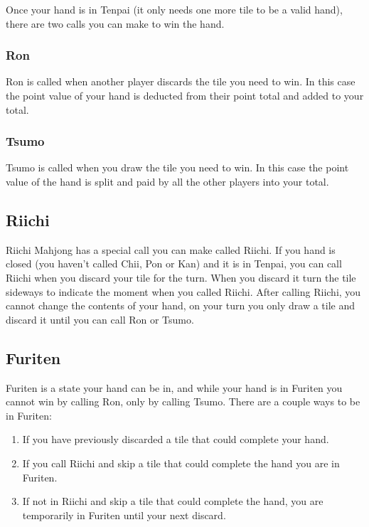\documentclass[a4paper,12pt]{article}
\begin{document}
Once your hand is in Tenpai (it only needs one more tile 
to be a valid hand), there are two calls you can make to 
win the hand.

\subsubsection{Ron}

Ron is called when another player discards the tile you need 
to win. In this case the point value of your hand is 
deducted from their point total and added to your total.

\subsubsection{Tsumo}

Tsumo is called when you draw the tile you need to win. 
In this case the point value of the hand is split and 
paid by all the other players into your total.

\subsection{Riichi}

Riichi Mahjong has a special call you can make called 
Riichi. If you hand is closed (you haven't called Chii, Pon 
or Kan) and it is in Tenpai, you can call Riichi when 
you discard your tile for the turn. When you discard it 
turn the tile sideways to indicate the moment when you 
called Riichi. After calling Riichi, you cannot change the 
contents of your hand, on your turn you only draw a tile 
and discard it until you can call Ron or Tsumo.

\subsection{Furiten}

Furiten is a state your hand can be in, and while your 
hand is in Furiten you cannot win by calling Ron, only 
by calling Tsumo. There are a couple ways to be in Furiten:
\begin{enumerate}
\item If you have previously discarded a tile that could 
complete your hand. 
\item If you call Riichi and skip  
a tile that could complete the hand you are in Furiten.
\item If not in Riichi and skip a tile
that could complete the hand, you are temporarily in Furiten 
until your next discard.
\end{enumerate}
\end{document}
